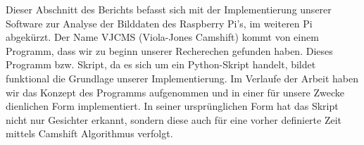 Dieser Abschnitt des Berichts befasst sich mit der Implementierung unserer Software zur Analyse der Bilddaten des Raspberry Pi's, im weiteren Pi abgekürzt. Der Name VJCMS (Viola-Jones Camshift) kommt von einem Programm, dass wir zu beginn unserer Recherechen gefunden haben.\cite{vjcms} Dieses Programm bzw. Skript, da es sich um ein Python-Skript handelt, bildet funktional die Grundlage unserer Implementierung. Im Verlaufe der Arbeit haben wir das Konzept des Programms aufgenommen und in einer für unsere Zwecke dienlichen Form implementiert.
In seiner ursprünglichen Form hat das Skript nicht nur Gesichter erkannt, sondern diese auch für eine vorher definierte Zeit mittels Camshift Algorithmus verfolgt. 

 